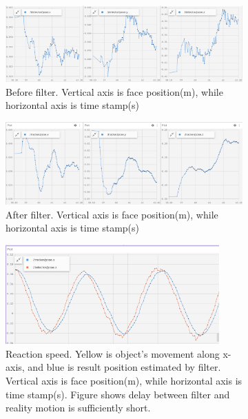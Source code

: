 \begin{figure}[htb]
    \centering
    \begin{subfigure}[t]{1\linewidth}
        \centering
        \includegraphics[width=1\textwidth]{figures/Implementation/before_filter.png}
        \caption{Before filter. Vertical axis is face position(m), while horizontal axis is time stamp(s)}\label{F:test-b-sub-a}
    \end{subfigure}
    \begin{subfigure}[t]{1\linewidth}
        \centering
        \includegraphics[width=1\textwidth]{figures/Implementation/after_filter.png}
        \caption{After filter. Vertical axis is face position(m), while horizontal axis is time stamp(s)}\label{F:test-b-sub-b}
    \end{subfigure}
    \begin{subfigure}[t]{1\linewidth}
        \centering
        \includegraphics[width=0.9\textwidth]{figures/Implementation/reaction.png}
        \caption{Reaction speed. Yellow is object's movement along x-axis, and blue is result position estimated by filter. Vertical axis is face position(m), while horizontal axis is time stamp(s). Figure shows delay between filter and reality motion is sufficiently short.}\label{F:test-b-sub-b}
    \end{subfigure}
    \caption{}\label{F:test-b}
\end{figure}

